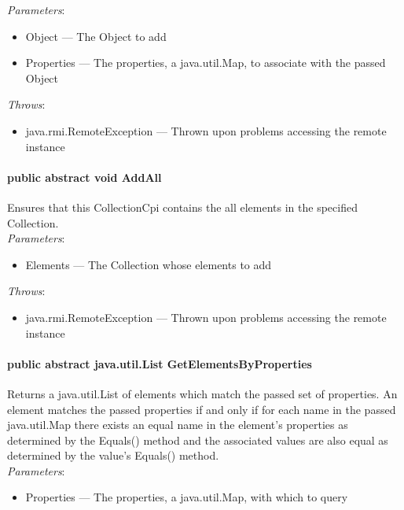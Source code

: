 \documentclass[$Date: 2003/06/26 19:29:31 $]{glabarticle}
\begin{document}
\textit{Parameters}:
\begin{itemize}
\item[] Object --- The Object to add 
\item[] Properties --- The properties, a java.util.Map, to associate with the passed Object 
\end{itemize}

 \textit{Throws}:
 \begin{itemize}
 \item[] java.rmi.RemoteException --- Thrown upon problems accessing the remote instance 
 \end{itemize}

\paragraph{public abstract void AddAll}

Ensures that this CollectionCpi contains the all elements in the
specified Collection.\\

\textit{Parameters}:
\begin{itemize}
\item[] Elements --- The Collection whose elements to add 
\end{itemize}

 \textit{Throws}:
 \begin{itemize}
 \item[] java.rmi.RemoteException --- Thrown upon problems accessing the remote instance 
 \end{itemize}

\paragraph{public abstract java.util.List GetElementsByProperties}

Returns a java.util.List of elements which match the passed set of
properties. An element matches the passed properties if and only if
for each name in the passed java.util.Map there exists an equal name in
the element's properties as determined by the Equals() method and the
associated values are also equal as determined by the value's Equals()
method.\\

\textit{Parameters}:
\begin{itemize}
\item[] Properties --- The properties, a java.util.Map, with which to query 
\end{itemize}
\end{document}
